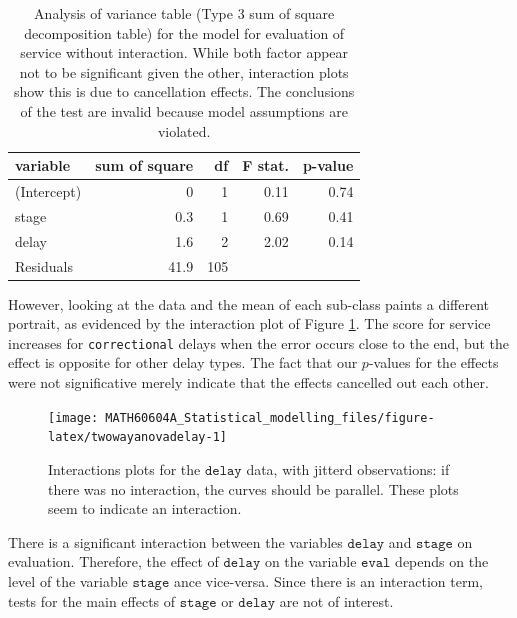 \documentclass[
  11pt,
  letterpaper,
]{book}
\theoremstyle{definition}
\theoremstyle{definition}
\theoremstyle{definition}
\theoremstyle{definition}
\theoremstyle{remark}
\begin{document}
\begin{table}

\caption{\label{tab:summaryanovadelaynointer}Analysis of variance table (Type 3 sum of square decomposition table) for the model for evaluation of service without interaction. While both factor appear not to be significant given the other, interaction plots show this is due to cancellation effects. The conclusions of the test are invalid because model assumptions are violated.}
\centering
\begin{tabular}[t]{lrrrr}
\toprule
variable & sum of square & df & F stat. & p-value\\
\midrule
(Intercept) & 0 & 1 & 0.11 & 0.74\\
stage & 0.3 & 1 & 0.69 & 0.41\\
delay & 1.6 & 2 & 2.02 & 0.14\\
Residuals & 41.9 & 105 &  & \\
\bottomrule
\end{tabular}
\end{table}

However, looking at the data and the mean of each sub-class paints a different portrait, as evidenced by the interaction plot of Figure \ref{fig:twowayanovadelay}. The score for service increases for \texttt{correctional} delays when the error occurs close to the end, but the effect is opposite for other delay types. The fact that our \(p\)-values for the effects were not significative merely indicate that the effects cancelled out each other.

\begin{figure}

{\centering \texttt{[image: MATH60604A\_Statistical\_modelling\_files/figure-latex/twowayanovadelay-1]} 

}

\caption{Interactions plots for the $\texttt{delay}$ data, with jitterd observations: if there was no interaction, the curves should be parallel. These plots seem to indicate an interaction.}\label{fig:twowayanovadelay}
\end{figure}

There is a significant interaction between the variables \(\texttt{delay}\) and \(\texttt{stage}\) on evaluation. Therefore, the effect of \(\texttt{delay}\) on the variable \(\texttt{eval}\) depends on the level of the variable \(\texttt{stage}\) ance vice-versa. Since there is an interaction term, tests for the main effects of \(\texttt{stage}\) or \(\texttt{delay}\) are not of interest.
\end{document}
